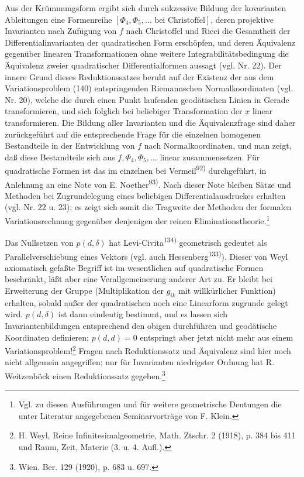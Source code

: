 Aus der Krümmungsform ergibt sich durch sukzessive Bildung der kovarianten Ableitungen eine Formenreihe $[\Phi_4,\Phi_5,\ldots\text{ bei Christoffel}]$, deren projektive Invarianten nach Zufügung von $f$ nach Christoffel und Ricci die Gesamtheit der Differentialinvarianten der quadratischen Form erschöpfen, und deren Äquivalenz gegenüber linearen Transformationen ohne weitere Integrabilitätsbedingung die Äquivalenz zweier quadratischer Differentialformen aussagt (vgl. Nr. 22). Der innere Grund dieses Reduktionssatzes beruht auf der Existenz der aus dem Variationsproblem (140) entspringenden Riemannschen Normalkoordinaten (vgl. Nr. 20), welche die durch einen Punkt laufenden geodätischen Linien in Gerade transformieren, und sich folglich bei beliebiger Transformation der $x$ linear transformieren. Die Bildung aller Invarianten und die Äquivalenzfrage sind daher zurückgeführt auf die entsprechende Frage für die einzelnen homogenen Bestandteile in der Entwicklung von $f$ nach Normalkoordinaten, und man zeigt, daß diese Bestandteile sich aus $f,\Phi_4,\Phi_5,\ldots$ linear zusammensetzen. Für quadratische Formen ist das im einzelnen bei Vermeil\textsuperscript{92)} durchgeführt, in Anlehnung an eine Note von E. Noether\textsuperscript{93)}. Nach dieser Note bleiben Sätze und Methoden bei Zugrundelegung eines beliebigen Differentialausdruckes erhalten (vgl. Nr. 22 u. 23); es zeigt sich somit die Tragweite der Methoden der formalen Variationsrechnung gegenüber denjenigen der reinen Eliminationstheorie.\footnote{Vgl. zu diesen Ausführungen und für weitere geometrische Deutungen die unter \glqq{}Literatur\grqq{} angegebenen Seminarvorträge von F. Klein.}

Das Nullsetzen von $p(d,\delta)$ hat Levi-Civita\textsuperscript{134)} geometrisch gedeutet als \glqq{}Parallelverschiebung eines Vektors\grqq{} (vgl. auch Hessenberg\textsuperscript{133)}). Dieser von Weyl axiomatisch gefaßte Begriff ist im wesentlichen auf quadratische Formen beschränkt, läßt aber eine Verallgemeinerung anderer Art zu. Er bleibt bei Erweiterung der Gruppe (Multiplikation der $g_{ik}$ mit willkürlicher Funktion) erhalten, sobald außer der quadratischen noch eine Linearform zugrunde gelegt wird. $p(d,\delta)$ ist dann eindeutig bestimmt, und es lassen sich Invariantenbildungen entsprechend den obigen durchführen und geodätische Koordinaten definieren; $p(d,d)=0$ entspringt aber jetzt nicht mehr aus einem Variationsproblem!\footnote{H. Weyl, Reine Infinitesimalgeometrie, Math. Ztschr. 2 (1918), p. 384 bis 411 und Raum, Zeit, Materie (3. u. 4. Aufl.).} Fragen nach Reduktionssatz und Äquivalenz sind hier noch nicht allgemein angegriffen; nur für Invarianten niedrigster Ordnung hat R. Weitzenböck einen Reduktionssatz gegeben.\footnote{Wien. Ber. 129 (1920), p. 683 u. 697.}

